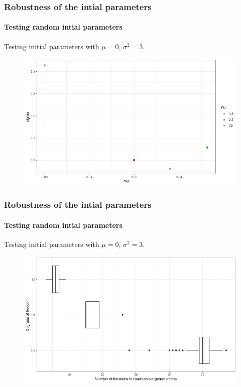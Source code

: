 \documentclass[aspectratio=169]{beamer}
\begin{document}
\begin{frame}
    \frametitle{Robustness of the intial parameters}
    \framesubtitle{Testing random intial parameters}
    Testing initial parameters with $\mu = 0$, $\sigma^{2} = 3$.
    \begin{figure}
        \centering
        \includegraphics[scale=0.4]{pictures/ConvergentRobustness.png}
    \end{figure}
\end{frame}

\begin{frame}
    \frametitle{Robustness of the intial parameters}
    \framesubtitle{Testing random intial parameters}
    Testing initial parameters with $\mu = 0$, $\sigma^{2} = 3$.
    \begin{figure}
        \centering
        \includegraphics[scale=0.4]{pictures/IterationsToConvergenceRobustness.png}
    \end{figure}
\end{frame}
\end{document}
